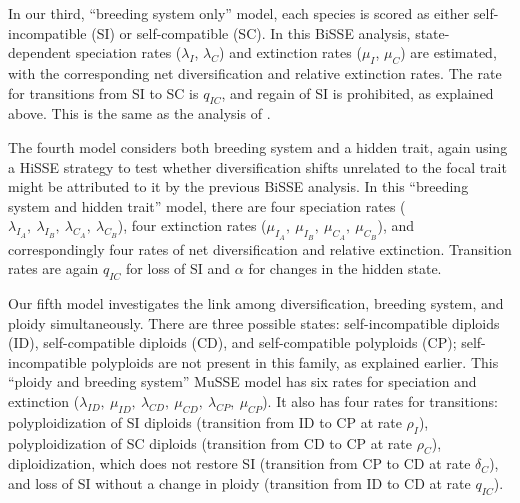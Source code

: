 
In our third, ``breeding system only'' model, each species is scored as either self-incompatible (SI) or self-compatible (SC).
In this BiSSE analysis, state-dependent speciation rates ($\lambda_I$, $\lambda_C$) and extinction rates ($\mu_I$, $\mu_C$) are estimated, with the corresponding net diversification and relative extinction rates.
The rate for transitions from SI to SC is $q_{IC}$, and regain of SI is prohibited, as explained above.
This is the same as the analysis of \citet{goldberg_2010}.

The fourth model considers both breeding system and a hidden trait, again using a HiSSE strategy to test whether diversification shifts unrelated to the focal trait might be attributed to it by the previous BiSSE analysis.
In this ``breeding system and hidden trait'' model, there are four speciation rates ($\lambda_{I_A},\ \lambda_{I_B},\  \lambda_{C_A},\ \lambda_{C_B}$), four extinction rates ($\mu_{I_A},\ \mu_{I_B},\ \mu_{C_A},\ \mu_{C_B}$), and correspondingly four rates of net diversification and relative extinction.
Transition rates are again $q_{IC}$ for loss of SI and $\alpha$ for changes in the hidden state.

Our fifth model investigates the link among diversification, breeding system, and ploidy simultaneously.
There are three possible states: self-incompatible diploids (ID), self-compatible diploids (CD), and self-compatible polyploids (CP); self-incompatible polyploids are not present in this family, as explained earlier.
This ``ploidy and breeding system'' MuSSE model \citep{fitzjohn_2012} has six rates for speciation and extinction ($\lambda_{ID},\ \mu_{ID},\ \lambda_{CD},\ \mu_{CD},\ \lambda_{CP},\ \mu_{CP}$).
It also has four rates for transitions:
polyploidization of SI diploids (transition from ID to CP at rate $\rho_I$),
polyploidization of SC diploids (transition from CD to CP at rate $\rho_C$),
diploidization, which does not restore SI (transition from CP to CD at rate $\delta_C$),
and loss of SI without a change in ploidy (transition from ID to CD at rate $q_{IC}$).

